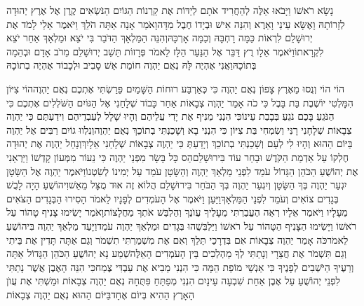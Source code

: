 \documentclass[../main/main.tex]{subfiles}
\begin{document}
\begin{multicols*}{\ncols}
נָשָׂא רֹאשׁוֹ וַיָּבֹאוּ אֵלֶּה לְהַחֲרִיד אֹתָם לְיַדּוֹת אֶת קַרְנוֹת הַגּוֹיִם הַנֹּשְׂאִים קֶרֶן אֶל אֶרֶץ יְהוּדָה לְזָרוֹתָהּ \ClosedSection{}וָאֶשָּׂא עֵינַי וָאֵרֶא וְהִנֵּה אִישׁ וּבְיָדוֹ חֶבֶל מִדָּה\PreVerseSpace{}וָאֹמַר אָנָה אַתָּה הֹלֵךְ וַיֹּאמֶר אֵלַי לָמֹד אֶת יְרוּשָׁלֵם לִרְאוֹת כַּמָּה רָחְבָּהּ וְכַמָּה אָרְכָּהּ\PreVerseSpace{}וְהִנֵּה הַמַּלְאָךְ הַדֹּבֵר בִּי יֹצֵא וּמַלְאָךְ אַחֵר יֹצֵא לִקְרָאתוֹ\PreVerseSpace{}וַיֹּאמֶר אֵלָו רֻץ דַּבֵּר אֶל הַנַּעַר הַלָּז לֵאמֹר פְּרָזוֹת תֵּשֵׁב יְרוּשָׁלֵם מֵרֹב אָדָם וּבְהֵמָה בְּתוֹכָהּ\PreVerseSpace{}וַאֲנִי אֶהְיֶה לָּהּ נְאֻם יַהְוֶה חוֹמַת אֵשׁ סָבִיב וּלְכָבוֹד אֶהְיֶה בְתוֹכָהּ\OpenSection{}\par
{}הוֹי הוֹי וְנֻסוּ מֵאֶרֶץ צָפוֹן נְאֻם יַהְוֶה כִּי כְּאַרְבַּע רוּחוֹת הַשָּׁמַיִם פֵּרַשְׂתִּי אֶתְכֶם נְאֻם יַהְוֶה\PreVerseSpace{}הוֹי צִיּוֹן הִמָּלְטִי יוֹשֶׁבֶת בַּת בָּבֶל \ClosedSection{}כִּי כֹה אָמַר יַהְוֶה צְבָאוֹת אַחַר כָּבוֹד שְׁלָחַנִי אֶל הַגּוֹיִם הַשֹּׁלְלִים אֶתְכֶם כִּי הַנֹּגֵעַ בָּכֶם נֹגֵעַ בְּבָבַת עֵינוֹ\PreVerseSpace{}כִּי הִנְנִי מֵנִיף אֶת יָדִי עֲלֵיהֶם וְהָיוּ שָׁלָל לְעַבְדֵיהֶם וִידַעְתֶּם כִּי יַהְוֶה צְבָאוֹת שְׁלָחָנִי \ClosedSection{}רָנִּי וְשִׂמְחִי בַּת צִיּוֹן כִּי הִנְנִי בָא וְשָׁכַנְתִּי בְתוֹכֵךְ נְאֻם יַהְוֶה\PreVerseSpace{}וְנִלְווּ גוֹיִם רַבִּים אֶל יַהְוֶה בַּיּוֹם הַהוּא וְהָיוּ לִי לְעָם וְשָׁכַנְתִּי בְתוֹכֵךְ וְיָדַעַתְּ כִּי יַהְוֶה צְבָאוֹת שְׁלָחַנִי אֵלָיִךְ\PreVerseSpace{}וְנָחַל יַהְוֶה אֶת יְהוּדָה חֶלְקוֹ עַל אַדְמַת הַקֹּדֶשׁ וּבָחַר עוֹד בִּירוּשָׁלֵם\PreVerseSpace{}הַס כָּל בָּשָׂר מִפְּנֵי יַהְוֶה כִּי נֵעוֹר מִמְּעוֹן קָדְשׁוֹ \ClosedSection{}וַיַּרְאֵנִי אֶת יְהוֹשֻׁעַ הַכֹּהֵן הַגָּדוֹל עֹמֵד לִפְנֵי מַלְאַךְ יַהְוֶה וְהַשָּׂטָן עֹמֵד עַל יְמִינוֹ לְשִׂטְנוֹ\PreVerseSpace{}וַיֹּאמֶר יַהְוֶה אֶל הַשָּׂטָן יִגְעַר יַהְוֶה בְּךָ הַשָּׂטָן וְיִגְעַר יַהְוֶה בְּךָ הַבֹּחֵר בִּירוּשָׁלֵם הֲלוֹא זֶה אוּד מֻצָּל מֵאֵשׁ\PreVerseSpace{}וִיהוֹשֻׁעַ הָיָה לָבֻשׁ בְּגָדִים צוֹאִים וְעֹמֵד לִפְנֵי הַמַּלְאָךְ\PreVerseSpace{}וַיַּעַן וַיֹּאמֶר אֶל הָעֹמְדִים לְפָנָיו לֵאמֹר הָסִירוּ הַבְּגָדִים הַצֹּאִים מֵעָלָיו וַיֹּאמֶר אֵלָיו רְאֵה הֶעֱבַרְתִּי מֵעָלֶיךָ עֲוֺנֶךָ וְהַלְבֵּשׁ אֹתְךָ מַחֲלָצוֹת\PreVerseSpace{}וָאֹמַר יָשִׂימוּ צָנִיף טָהוֹר עַל רֹאשׁוֹ וַיָּשִׂימוּ הַצָּנִיף הַטָּהוֹר עַל רֹאשׁוֹ וַיַּלְבִּשֻׁהוּ בְּגָדִים וּמַלְאַךְ יַהְוֶה עֹמֵד\PreVerseSpace{}וַיָּעַד מַלְאַךְ יַהְוֶה בִּיהוֹשֻׁעַ לֵאמֹר\PreVerseSpace{}כֹּה אָמַר יַהְוֶה צְבָאוֹת אִם בִּדְרָכַי תֵּלֵךְ וְאִם אֶת מִשְׁמַרְתִּי תִשְׁמֹר וְגַם אַתָּה תָּדִין אֶת בֵּיתִי וְגַם תִּשְׁמֹר אֶת חֲצֵרָי וְנָתַתִּי לְךָ מַהְלְכִים בֵּין הָעֹמְדִים הָאֵלֶּה\PreVerseSpace{}שְׁמַע נָא יְהוֹשֻׁעַ הַכֹּהֵן הַגָּדוֹל אַתָּה וְרֵעֶיךָ הַיֹּשְׁבִים לְפָנֶיךָ כִּי אַנְשֵׁי מוֹפֵת הֵמָּה כִּי הִנְנִי מֵבִיא אֶת עַבְדִּי צֶמַח\PreVerseSpace{}כִּי הִנֵּה הָאֶבֶן אֲשֶׁר נָתַתִּי לִפְנֵי יְהוֹשֻׁעַ עַל אֶבֶן אַחַת שִׁבְעָה עֵינָיִם הִנְנִי מְפַתֵּחַ פִּתֻּחָהּ נְאֻם יַהְוֶה צְבָאוֹת וּמַשְׁתִּי אֶת עֲוֺן הָאָרֶץ הַהִיא בְּיוֹם אֶחָד\PreVerseSpace{}בַּיּוֹם הַהוּא נְאֻם יַהְוֶה צְבָאוֹת 
\end{multicols*}
\end{document}
